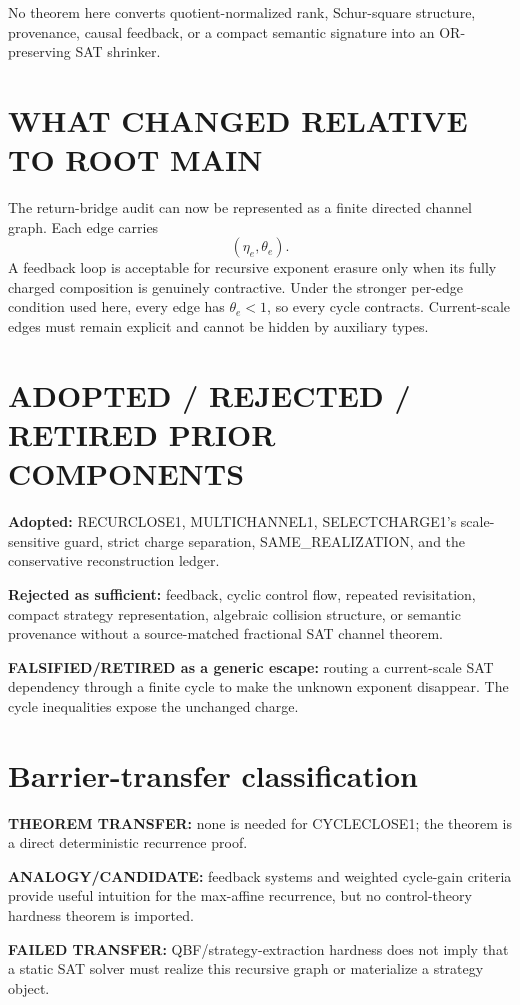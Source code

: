 \documentclass[11pt]{article}
\begin{document}
No theorem here converts quotient-normalized rank, Schur-square structure, provenance, causal feedback, or a compact semantic signature into an OR-preserving SAT shrinker.

\section*{WHAT CHANGED RELATIVE TO ROOT MAIN}
The return-bridge audit can now be represented as a finite directed channel graph. Each edge carries
\[
(\eta_e,\theta_e).
\]
A feedback loop is acceptable for recursive exponent erasure only when its fully charged composition is genuinely contractive. Under the stronger per-edge condition used here, every edge has \(\theta_e<1\), so every cycle contracts. Current-scale edges must remain explicit and cannot be hidden by auxiliary types.

\section*{ADOPTED / REJECTED / RETIRED PRIOR COMPONENTS}
\textbf{Adopted:} RECURCLOSE1, MULTICHANNEL1, SELECTCHARGE1's scale-sensitive guard, strict charge separation, SAME\_REALIZATION, and the conservative reconstruction ledger.

\textbf{Rejected as sufficient:} feedback, cyclic control flow, repeated revisitation, compact strategy representation, algebraic collision structure, or semantic provenance without a source-matched fractional SAT channel theorem.

\textbf{FALSIFIED/RETIRED as a generic escape:} routing a current-scale SAT dependency through a finite cycle to make the unknown exponent disappear. The cycle inequalities expose the unchanged charge.

\section*{Barrier-transfer classification}
\textbf{THEOREM TRANSFER:} none is needed for CYCLECLOSE1; the theorem is a direct deterministic recurrence proof.

\textbf{ANALOGY/CANDIDATE:} feedback systems and weighted cycle-gain criteria provide useful intuition for the max-affine recurrence, but no control-theory hardness theorem is imported.

\textbf{FAILED TRANSFER:} QBF/strategy-extraction hardness does not imply that a static SAT solver must realize this recursive graph or materialize a strategy object.
\end{document}
